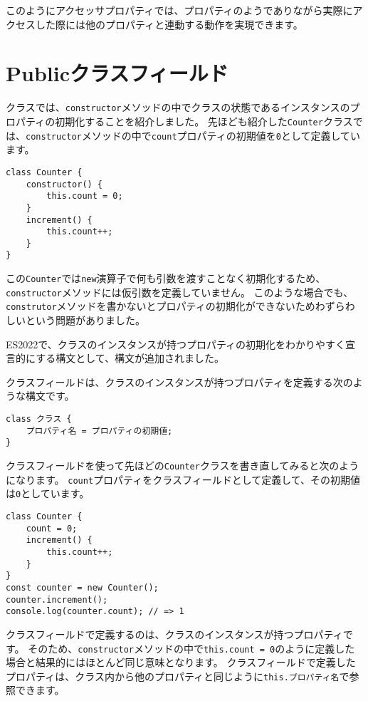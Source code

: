 このようにアクセッサプロパティでは、プロパティのようでありながら実際にアクセスした際には他のプロパティと連動する動作を実現できます。

\hypertarget{public-class-fields}{%
\section{Publicクラスフィールド\,\protect{}}\label{public-class-fields}}

クラスでは、\texttt{constructor}メソッドの中でクラスの状態であるインスタンスのプロパティの初期化することを紹介しました。
先ほども紹介した\texttt{Counter}クラスでは、\texttt{constructor}メソッドの中で\texttt{count}プロパティの初期値を\texttt{0}として定義しています。

\begin{lstlisting}
class Counter {
    constructor() {
        this.count = 0;
    }
    increment() {
        this.count++;
    }
}
\end{lstlisting}

この\texttt{Counter}では\texttt{new}演算子で何も引数を渡すことなく初期化するため、\texttt{constructor}メソッドには仮引数を定義していません。
このような場合でも、\texttt{construtor}メソッドを書かないとプロパティの初期化ができないためわずらわしいという問題がありました。

ES2022で、クラスのインスタンスが持つプロパティの初期化をわかりやすく宣言的にする構文として、\textbf{}構文が追加されました。

クラスフィールドは、クラスのインスタンスが持つプロパティを定義する次のような構文です。

\begin{lstlisting}
class クラス {
    プロパティ名 = プロパティの初期値;
}
\end{lstlisting}

クラスフィールドを使って先ほどの\texttt{Counter}クラスを書き直してみると次のようになります。
\texttt{count}プロパティをクラスフィールドとして定義して、その初期値は\texttt{0}としています。

\begin{lstlisting}
class Counter {
    count = 0;
    increment() {
        this.count++;
    }
}
const counter = new Counter();
counter.increment();
console.log(counter.count); // => 1
\end{lstlisting}

クラスフィールドで定義するのは、クラスのインスタンスが持つプロパティです。
そのため、\texttt{constructor}メソッドの中で\texttt{this.count = 0}のように定義した場合と結果的にはほとんど同じ意味となります。
クラスフィールドで定義したプロパティは、クラス内から他のプロパティと同じように\texttt{this.プロパティ名}で参照できます。

